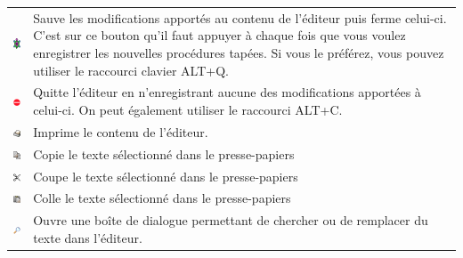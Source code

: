 \begin{longtable}{cm{12cm}}
\includegraphics*[scale=1]{images/tortue.png} & Sauve les modifications apportés au contenu de l'éditeur puis ferme celui-ci. C'est sur ce bouton qu'il faut appuyer à chaque fois que vous voulez enregistrer les nouvelles procédures tapées. Si vous le préférez, vous pouvez utiliser le raccourci clavier ALT+Q.\\
\includegraphics*[scale=1]{images/quit.png} & Quitte l'éditeur en n'enregistrant aucune des modifications apportées à celui-ci. On peut également utiliser le raccourci ALT+C.\\
\includegraphics*[scale=1]{images/fileprint.png} & Imprime le contenu de l'éditeur.\\
\includegraphics*[scale=1]{images/editcopy.png} & Copie le texte sélectionné dans le presse-papiers\\
\includegraphics*[scale=1]{images/editcut.png} & Coupe le texte sélectionné dans le presse-papiers\\
\includegraphics*[scale=1]{images/editpaste.png} & Colle le texte sélectionné dans le presse-papiers\\
\includegraphics*[scale=1]{images/chercher.png} & Ouvre une boîte de dialogue permettant de chercher ou de remplacer du texte dans l'éditeur.\\
\end{longtable} 
